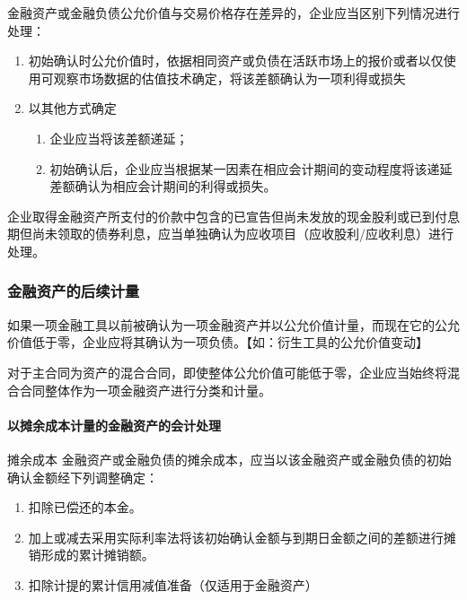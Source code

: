 \documentclass[UTF8,12pt]{ctexart}
\numberwithin{equation}{section} %
\numberwithin{figure}{section}
\numberwithin{table}{section}
\begin{document}
	金融资产或金融负债公允价值与交易价格存在差异的，企业应当区别下列情况进行处理：
	\begin{enumerate}
		\item 初始确认时公允价值时，依据相同资产或负债在活跃市场上的报价或者以仅使用可观察市场数据的估值技术确定，将该差额确认为一项利得或损失
		
		\item 以其他方式确定
		\begin{enumerate}
			\item 企业应当将该差额递延；
			
			\item 初始确认后，企业应当根据某一因素在相应会计期间的变动程度将该递延差额确认为相应会计期间的利得或损失。
		\end{enumerate}
	\end{enumerate}

	企业取得金融资产所支付的价款中包含的已宣告但尚未发放的现金股利或已到付息期但尚未领取的债券利息，应当单独确认为应收项目（应收股利/应收利息）进行处理。
	
	\subsubsection{金融资产的后续计量}
	如果一项金融工具以前被确认为一项金融资产并以公允价值计量，而现在它的公允价值低于零，企业应将其确认为一项负债。【如：衍生工具的公允价值变动】
	
	对于主合同为资产的混合合同，即使整体公允价值可能低于零，企业应当始终将混合合同整体作为一项金融资产进行分类和计量。
	
	\paragraph{以摊余成本计量的金融资产的会计处理}
	摊余成本
	金融资产或金融负债的摊余成本，应当以该金融资产或金融负债的初始确认金额经下列调整确定：
	\begin{enumerate}
		\item 扣除已偿还的本金。
		
		\item 加上或减去采用实际利率法将该初始确认金额与到期日金额之间的差额进行摊销形成的累计摊销额。
		
		\item 扣除计提的累计信用减值准备（仅适用于金融资产）
	\end{enumerate}
	
\end{document}
